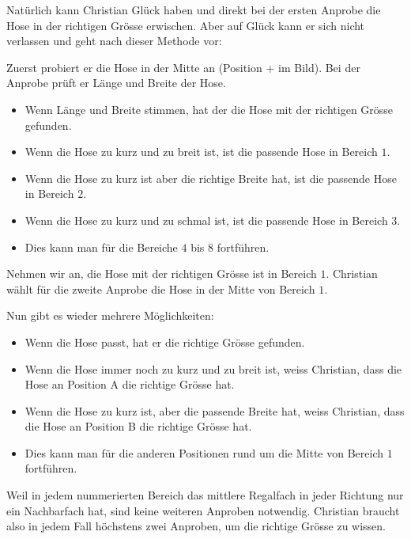 \documentclass[a4paper,11pt]{report}
\newcommand{\taskGraphicsFolder}{..}
\begin{document}
Natürlich kann Christian Glück haben und direkt bei der ersten Anprobe die Hose in der richtigen Grösse erwischen. Aber auf Glück kann er sich nicht verlassen und geht nach dieser Methode vor:

Zuerst probiert er die Hose in der Mitte an (Position + im Bild). Bei der Anprobe prüft er Länge und Breite der Hose.

\begin{itemize}
  \item Wenn Länge und Breite stimmen, hat der die Hose mit der richtigen Grösse gefunden.
  \item Wenn die Hose zu kurz und zu breit ist, ist die passende Hose in Bereich $1$.
  \item Wenn die Hose zu kurz ist aber die richtige Breite hat, ist die passende Hose in Bereich $2$.
  \item Wenn die Hose zu kurz und zu schmal ist, ist die passende Hose in Bereich $3$.
  \item Dies kann man für die Bereiche $4$ bis $8$ fortführen.
\end{itemize}

{\centering%
\par}

Nehmen wir an, die Hose mit der richtigen Grösse ist in Bereich $1$. Christian wählt für die zweite Anprobe die Hose in der Mitte von Bereich $1$.

Nun gibt es wieder mehrere Möglichkeiten:

\begin{itemize}
  \item Wenn die Hose passt, hat er die richtige Grösse gefunden.
  \item Wenn die Hose immer noch zu kurz und zu breit ist, weiss Christian, dass die Hose an Position A die richtige Grösse hat.
  \item Wenn die Hose zu kurz ist, aber die passende Breite hat, weiss Christian, dass die Hose an Position B die richtige Grösse hat.
  \item Dies kann man für die anderen Positionen rund um die Mitte von Bereich $1$ fortführen.
\end{itemize}

Weil in jedem nummerierten Bereich das mittlere Regalfach in jeder Richtung nur ein Nachbarfach hat, sind keine weiteren Anproben notwendig. Christian braucht also in jedem Fall höchstens zwei Anproben, um die richtige Grösse zu wissen.
\end{document}
